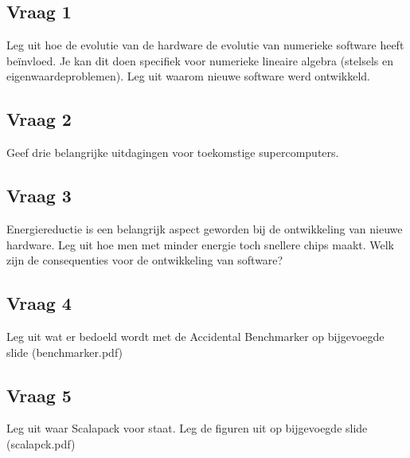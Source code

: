 \documentclass[../main.tex]{subfiles}
\begin{document}
\subsection{Vraag 1}
\begin{question}
Leg uit hoe de evolutie van de hardware de evolutie van numerieke software heeft beïnvloed. Je kan dit doen specifiek voor numerieke lineaire algebra (stelsels en eigenwaardeproblemen).
Leg uit waarom nieuwe software werd ontwikkeld.
\end{question}

\begin{solution}

\end{solution}

\subsection{Vraag 2}
\begin{question}
Geef drie belangrijke uitdagingen voor toekomstige supercomputers.
\end{question}

\begin{solution}

\end{solution}

\subsection{Vraag 3}
\begin{question}
Energiereductie is een belangrijk aspect geworden bij de ontwikkeling van nieuwe hardware. Leg uit hoe men met minder energie toch snellere chips maakt. Welk zijn de consequenties voor de ontwikkeling van software?
\end{question}

\begin{solution}

\end{solution}

\subsection{Vraag 4}
\begin{question}
Leg uit wat er bedoeld wordt met de Accidental Benchmarker op bijgevoegde slide (benchmarker.pdf)
\end{question}

\begin{solution}

\end{solution}

\subsection{Vraag 5}
\begin{question}
Leg uit waar Scalapack voor staat. Leg de figuren uit op bijgevoegde slide (scalapck.pdf)
\end{question}

\begin{solution}

\end{solution}
\end{document}
